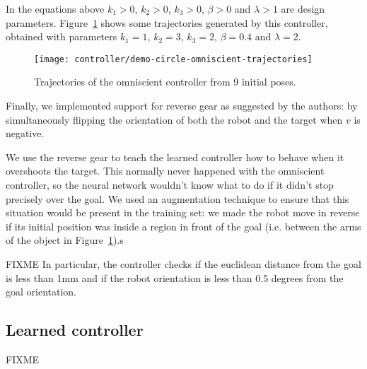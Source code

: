 In the equations above $k_1 > 0$, $k_2 > 0$, $k_3 > 0$, $\beta > 0$ and $\lambda > 1$ are design parameters. Figure~\ref{fig:omniscient-trajectories} shows some trajectories generated by this controller, obtained with parameters $k_1 = 1$, $k_2 = 3$, $k_3 = 2$, $\beta = 0.4$ and $\lambda = 2$.

\begin{figure}[htbp]
	\centerline{\texttt{[image: controller/demo-circle-omniscient-trajectories]}}
	\caption{Trajectories of the omniscient controller from 9 initial poses.}
	\label{fig:omniscient-trajectories}
\end{figure}

Finally, we implemented support for reverse gear as suggested by the authors: by simultaneously flipping the orientation of both the robot and the target when $v$ is negative. 

We use the reverse gear to teach the learned controller how to behave when it overshoots the target. This normally never happened with the omniscient controller, so the neural network wouldn't know what to do if it didn't stop precisely over the goal. We used an augmentation technique to ensure that this situation would be present in the training set: we made the robot move in reverse if its initial position was inside a region in front of the goal (i.e. between the arms of the object in Figure~\ref{fig:omniscient-trajectories}).s

FIXME In particular, the controller checks if the euclidean distance from 
the goal is less than 1mm and if the robot orientation is less than 0.5 degrees from the goal orientation.

\subsection{Learned controller}

FIXME
